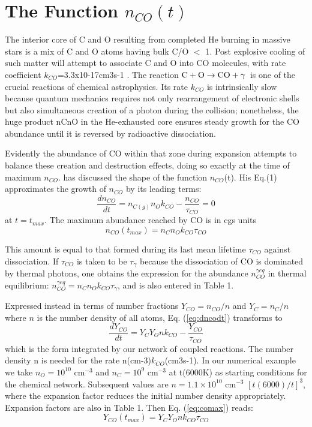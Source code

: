 \documentclass[manuscript]{aastex}
\newcommand{\cotoco}{${\rm C} + {\rm O} \to {\rm CO} + \gamma$}
\begin{document}
\section{The Function $n_{CO}(t)$}

The interior core of C and O resulting from completed He burning in massive
stars is a mix of C and O atoms having bulk C/O $<$ 1. Post explosive cooling of
such matter will attempt to associate C and O into CO molecules, with rate
coefficient $k_{CO}$=3.3x10-17cm3s-1 \citep{1990ApJ...358..262L}.
The reaction \cotoco\ is one of the crucial reactions of chemical
astrophysics. Its rate $k_{CO}$ is intrinsically slow because quantum mechanics
requires not only rearrangement of electronic shells but also simultaneous
creation of a photon during the collision; nonetheless, the huge product
nCnO in the He-exhausted core ensures steady growth for the CO abundance
until it is reversed by radioactive dissociation. 

Evidently the abundance of CO within that zone during expansion attempts to
balance these creation and destruction effects, doing so exactly at the
time of maximum $n_{CO}$. \citet{2013ApJ...762....5C}
has discussed the shape of the function
$n_{CO}$(t). His Eq.(1) approximates the growth of $n_{CO}$ by its leading terms:
\begin{equation}
\frac{dn_{CO}}{dt} = n_{C(g)} n_O k_{CO} - \frac{n_{CO}}{\tau_{CO}} = 0
\label{eq:dncodt}
\end{equation}
at $t = t_{max}$.
The maximum abundance reached by CO is in cgs units
\begin{equation}
n_{CO}(t_{max}) = n_C n_O k_{CO} \tau_{CO} 
\label{eq:comax}
\end{equation}

This amount is equal to that formed during its last mean lifetime $\tau_{CO}$
against dissociation. If $\tau_{CO}$ is taken to be $\tau_\gamma$ because
the dissociation of CO is dominated by thermal photons,
one obtains the expression for the abundance $n_{CO}^{\gamma eq}$ in thermal
equilibrium: $n_{CO}^{\gamma eq} = n_C n_O k_{CO} \tau_\gamma$,
and is also entered in Table 1. 

Expressed instead in terms of number fractions $Y_{CO} = n_{CO} / n$
and $Y_C = n_C / n$ where $n$ is the number density of all atoms,
Eq. (\ref{eq:dncodt}) transforms to 
\begin{equation}
\frac{dY_{CO}}{dt} = Y_C Y_O n k_{CO} - \frac{Y_{CO}}{\tau_{CO}}	
\label{eq:dycodt}
\end{equation}
which is the form integrated by our network of coupled reactions.
The number density n is needed for the rate n(cm-3)$k_{CO}$(cm3s-1).
In our numerical example we take $n_O = 10^{10}$ cm$^{-3}$ and
$n_C = 10^9$ cm$^{-3}$ at t(6000K) as starting conditions for the
chemical network. Subsequent values are $n = 1.1 \times 10^{10}$ cm$^{-3}$
$[t(6000)/t]^3$, where the expansion factor reduces the initial number
density appropriately. Expansion factors are also in Table 1. Then
Eq. (\ref{eq:comax}) reads:
\begin{equation}
Y_{CO}(t_{max}) = Y_C Y_O n k_{CO} \tau_{CO}
\label{eq:ycomax}
\end{equation}
\end{document}
